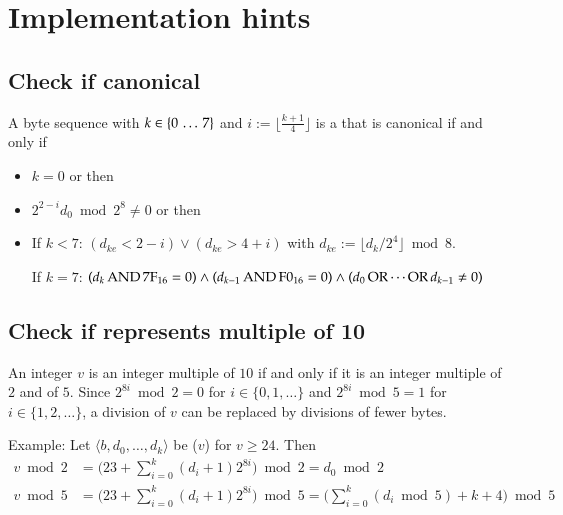 
\section{Implementation hints}
\label{sec:implementation}

\subsection{Check if canonical \DborBinaryRationalValue}
\label{sec:implementation:BinaryRationalValue:canonical}

A byte sequence  with
$k \in \{0 \,\ldots\, 7\}$ and $i := \lfloor \frac{k + 1}{4} \rfloor$
is a \DborBinaryRationalValue{} that is canonical if and only if
\begin{itemize}
    \item
    $k = 0$ or then

    \item
    $2^{2 - i} d_0 \bmod 2^8 \ne 0$ or then

    \item
    If $k < 7$:
    $(d_{ke} < 2 - i) \vee (d_{ke} > 4 + i)$
    with $d_{ke} := \lfloor d_k / 2^4 \rfloor \bmod 8$.

    If $k = 7$:
    $(d_k \operatorname{AND} \mathrm{7F}_{16} = 0) \wedge (d_{k - 1} \operatorname{AND} \mathrm{F0}_{16} = 0)
    \wedge (d_0 \operatorname{OR} \cdots \operatorname{OR} d_{k - 1} \ne 0)$
\end{itemize}


\subsection{Check if \DborIntegerValue{} represents multiple of 10}
\label{sec:implementation:IntegerValue:mod10}

An integer $v$ is an integer multiple of $10$ if and only if it is an integer multiple
of $2$ and of $5$.
Since $2^{8i} \bmod 2 = 0$ for $i \in \{0, 1, \ldots\}$
and $2^{8i} \bmod 5 = 1$ for $i \in \{1, 2, \ldots\}$,
a division of $v$ can be replaced by divisions of fewer bytes.

Example:
Let $\langle b, d_0, \ldots, d_k\rangle$ be \DborIntegerValue($v$) for $v \ge 24$.
Then
\begin{align*}
    v \bmod 2
        & = \big(23 + \sum_{i = 0}^k (d_i + 1) 2^{8 i}\big) \bmod 2
        = d_0 \bmod 2 \\
    v \bmod 5
        & = \big(23 + \sum_{i = 0}^k (d_i + 1) 2^{8 i}\big) \bmod 5
        = \big(\sum_{i = 0}^k (d_i \bmod 5) + k + 4\big) \bmod 5
\end{align*}
